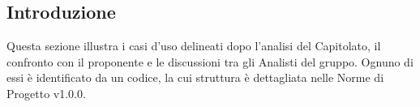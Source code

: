 \subsection{Introduzione}
Questa sezione illustra i casi d'uso delineati dopo l'analisi del Capitolato, il confronto con il proponente e le discussioni tra gli Analisti del gruppo. Ognuno di essi è identificato da un codice, la cui struttura è dettagliata nelle Norme di Progetto v1.0.0.